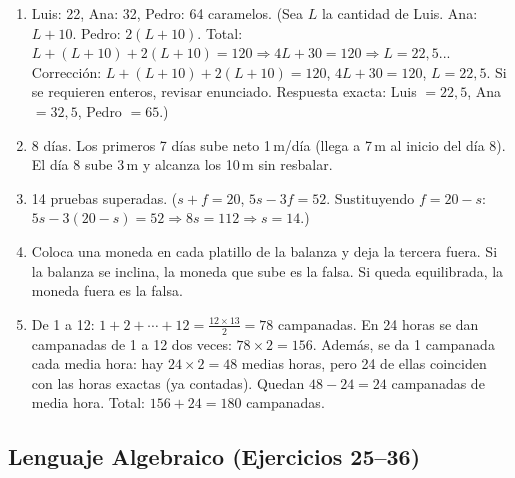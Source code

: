 \documentclass[12pt, a4paper]{article}
\begin{document}
\begin{enumerate}[leftmargin=*, label=\textbf{\arabic*.}]
  \item Luis: 22, Ana: 32, Pedro: 64 caramelos. (Sea $L$ la cantidad de Luis. Ana: $L + 10$. Pedro: $2(L + 10)$. Total: $L + (L + 10) + 2(L + 10) = 120 \Rightarrow 4L + 30 = 120 \Rightarrow L = 22{,}5$... Corrección: $L + (L+10) + 2(L+10) = 120$, $4L + 30 = 120$, $L = 22{,}5$. Si se requieren enteros, revisar enunciado. Respuesta exacta: Luis $= 22{,}5$, Ana $= 32{,}5$, Pedro $= 65$.)

  \item 8 días. Los primeros 7 días sube neto 1\,m/día (llega a 7\,m al inicio del día 8). El día 8 sube 3\,m y alcanza los 10\,m sin resbalar.

  \item 14 pruebas superadas. ($s + f = 20$, $5s - 3f = 52$. Sustituyendo $f = 20 - s$: $5s - 3(20 - s) = 52 \Rightarrow 8s = 112 \Rightarrow s = 14$.)

  \item Coloca una moneda en cada platillo de la balanza y deja la tercera fuera. Si la balanza se inclina, la moneda que sube es la falsa. Si queda equilibrada, la moneda fuera es la falsa.

  \item De 1 a 12: $1 + 2 + \cdots + 12 = \frac{12 \times 13}{2} = 78$ campanadas. En 24 horas se dan campanadas de 1 a 12 dos veces: $78 \times 2 = 156$. Además, se da 1 campanada cada media hora: hay $24 \times 2 = 48$ medias horas, pero 24 de ellas coinciden con las horas exactas (ya contadas). Quedan $48 - 24 = 24$ campanadas de media hora. Total: $156 + 24 = 180$ campanadas.
\end{enumerate}

\subsection*{Lenguaje Algebraico (Ejercicios 25--36)}
\end{document}
